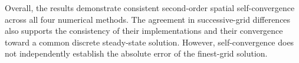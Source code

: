 Overall, the results demonstrate consistent second-order
spatial self-convergence across all four numerical methods.
The agreement in successive-grid differences also supports
the consistency of their implementations and their
convergence toward a common discrete steady-state solution.
However, self-convergence does not independently establish
the absolute error of the finest-grid solution.